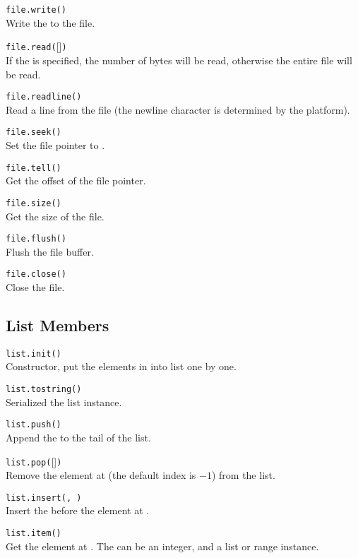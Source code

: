 \hangpar \texttt{file.write(}\texttt{)}\\
Write the  to the file.

\hangpar \texttt{file.read(}[]\texttt{)}\\
If the  is specified, the number of bytes will be read, otherwise the entire file will be read.

\hangpar \texttt{file.readline()}\\
Read a line from the file (the newline character is determined by the platform).

\hangpar \texttt{file.seek(}\texttt{)}\\
Set the file pointer to .

\hangpar \texttt{file.tell()}\\
Get the offset of the file pointer.

\hangpar \texttt{file.size()}\\
Get the size of the file.

\hangpar \texttt{file.flush()}\\
Flush the file buffer.

\hangpar \texttt{file.close()}\\
Close the file.

\subsection*{List Members}

\hangpar \texttt{list.init(}\texttt{)}\\
Constructor, put the elements in  into list one by one.

\hangpar \texttt{list.tostring()}\\
Serialized the list instance.

\hangpar \texttt{list.push(}\texttt{)}\\
Append the  to the tail of the list.

\hangpar \texttt{list.pop(}[]\texttt{)}\\
Remove the element at  (the default index is $-1$) from the list.

\hangpar \texttt{list.insert(}\texttt{, }\texttt{)}\\
Insert the  before the element at .

\hangpar \texttt{list.item(}\texttt{)}\\
Get the element at . The  can be an \textsf{integer}, and a \textsf{list} or \textsf{range} instance.

